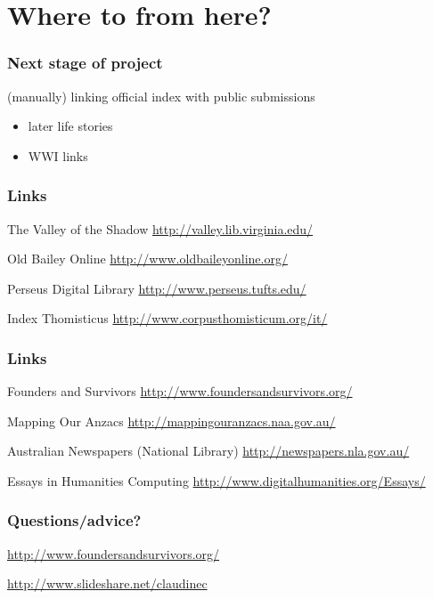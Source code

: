 \documentclass[ignorenonframetext,11pt]{beamer}
\def\mybibliostyle{plain}
\def\bibliocommand{}
\begin{document}
\section{Where to from here?}
\label{wheretofromhere}

\begin{frame}
\frametitle{Next stage of project}
\label{nextstageofproject}

(manually) linking official index with public submissions


\begin{itemize}


\item later life stories

\item WWI links
\end{itemize}


\end{frame}
		

\begin{frame}
\frametitle{Links}
\label{links}

The Valley of the Shadow \url{http://valley.lib.virginia.edu/}


Old Bailey Online \url{http://www.oldbaileyonline.org/}


Perseus Digital Library \url{http://www.perseus.tufts.edu/}


Index Thomisticus \url{http://www.corpusthomisticum.org/it/}



\end{frame}
		

\begin{frame}
\frametitle{Links}
\label{links}

Founders and Survivors \url{http://www.foundersandsurvivors.org/}


Mapping Our Anzacs \url{http://mappingouranzacs.naa.gov.au/}


Australian Newspapers (National Library) \url{http://newspapers.nla.gov.au/}


Essays in Humanities Computing \url{http://www.digitalhumanities.org/Essays/}



\end{frame}
		

\begin{frame}
\frametitle{Questions/advice?}
\label{questionsadvice}

\url{http://www.foundersandsurvivors.org/}


\url{http://www.slideshare.net/claudinec}



\end{frame}
		



%
\end{document}
